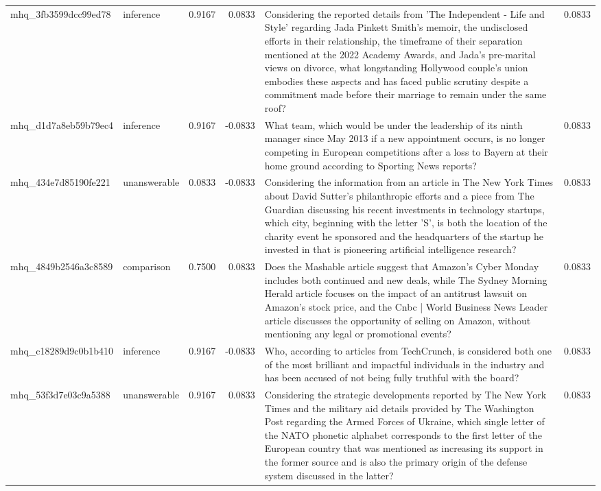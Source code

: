 \begin{tabular}{llrrlr}
mhq_3fb3599dcc99ed78 & inference & 0.9167 & 0.0833 & Considering the reported details from 'The Independent - Life and Style' regarding Jada Pinkett Smith's memoir, the undisclosed efforts in their relationship, the timeframe of their separation mentioned at the 2022 Academy Awards, and Jada's pre-marital views on divorce, what longstanding Hollywood couple's union embodies these aspects and has faced public scrutiny despite a commitment made before their marriage to remain under the same roof? & 0.0833 \\
mhq_d1d7a8eb59b79ec4 & inference & 0.9167 & -0.0833 & What team, which would be under the leadership of its ninth manager since May 2013 if a new appointment occurs, is no longer competing in European competitions after a loss to Bayern at their home ground according to Sporting News reports? & 0.0833 \\
mhq_434e7d85190fe221 & unanswerable & 0.0833 & -0.0833 & Considering the information from an article in The New York Times about David Sutter's philanthropic efforts and a piece from The Guardian discussing his recent investments in technology startups, which city, beginning with the letter 'S', is both the location of the charity event he sponsored and the headquarters of the startup he invested in that is pioneering artificial intelligence research? & 0.0833 \\
mhq_4849b2546a3c8589 & comparison & 0.7500 & 0.0833 & Does the Mashable article suggest that Amazon's Cyber Monday includes both continued and new deals, while The Sydney Morning Herald article focuses on the impact of an antitrust lawsuit on Amazon's stock price, and the Cnbc | World Business News Leader article discusses the opportunity of selling on Amazon, without mentioning any legal or promotional events? & 0.0833 \\
mhq_c18289d9c0b1b410 & inference & 0.9167 & -0.0833 & Who, according to articles from TechCrunch, is considered both one of the most brilliant and impactful individuals in the industry and has been accused of not being fully truthful with the board? & 0.0833 \\
mhq_53f3d7e03c9a5388 & unanswerable & 0.9167 & 0.0833 & Considering the strategic developments reported by The New York Times and the military aid details provided by The Washington Post regarding the Armed Forces of Ukraine, which single letter of the NATO phonetic alphabet corresponds to the first letter of the European country that was mentioned as increasing its support in the former source and is also the primary origin of the defense system discussed in the latter? & 0.0833 \\

\end{tabular}
